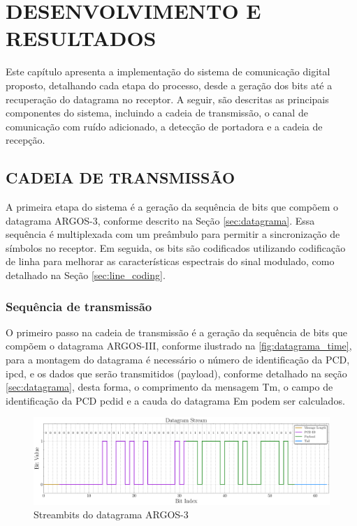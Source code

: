 \chapter{DESENVOLVIMENTO E RESULTADOS}\label{cap:desenvolvimento}

Este capítulo apresenta a implementação do sistema de comunicação digital proposto, detalhando cada etapa do processo, desde a geração dos bits até a recuperação do datagrama no receptor. A seguir, são descritas as principais componentes do sistema, incluindo a cadeia de transmissão, o canal de comunicação com ruído adicionado, a detecção de portadora e a cadeia de recepção.

\section{CADEIA DE TRANSMISSÃO}\label{sec:transmissao}

A primeira etapa do sistema é a geração da sequência de bits que compõem o datagrama ARGOS-3, conforme descrito na Seção \ref{sec:datagrama}. Essa sequência é multiplexada com um preâmbulo para permitir a sincronização de símbolos no receptor. Em seguida, os bits são codificados utilizando codificação de linha para melhorar as características espectrais do sinal modulado, como detalhado na Seção \ref{sec:line_coding}.

\subsection{Sequência de transmissão}\label{sec:geracao_bits}

O primeiro passo na cadeia de transmissão é a geração da sequência de bits que compõem o datagrama \gls{ARGOS-III}, conforme ilustrado na \autoref{fig:datagrama_time}, para a montagem do datagrama é necessário o número de identificação da PCD, \gls{ipcd}, e os dados que serão transmitidos (payload), conforme detalhado na seção \ref{sec:datagrama}, desta forma, o comprimento da mensagem \gls{Tm}, o campo de identificação da PCD \gls{pcdid} e a cauda do datagrama \gls{Em} podem ser calculados. 

\begin{figure}[H]
	\centering
	\caption{Streambits do datagrama ARGOS-3}\label{fig:datagrama_time}
	\includegraphics[width=\linewidth]{assets/cap3/transmitter_datagram_time.pdf}
\end{figure}

